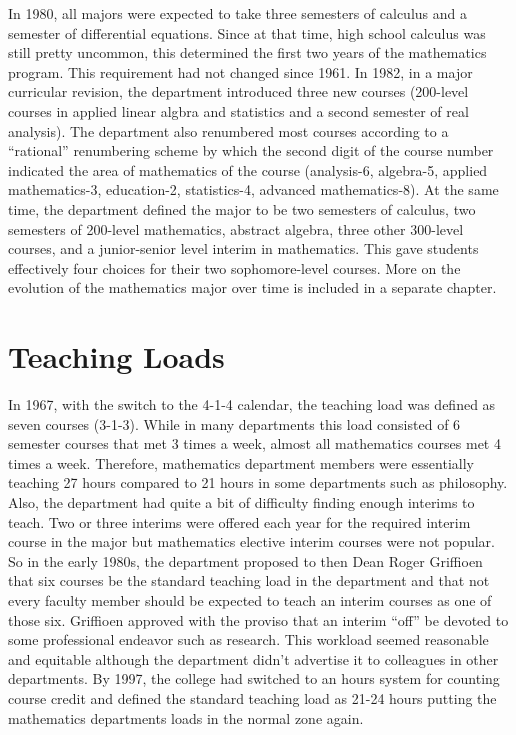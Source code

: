 \documentclass[
]{book}
\begin{document}
In 1980, all majors were expected to take three semesters of calculus and a semester of differential equations. Since at that time, high school calculus was still pretty uncommon, this determined the first two years of the mathematics program. This requirement had not changed since 1961. In 1982, in a major curricular revision, the department introduced three new courses (200-level courses in applied linear algbra and statistics and a second semester of real analysis). The department also renumbered most courses according to a ``rational'' renumbering scheme by which the second digit of the course number indicated the area of mathematics of the course (analysis-6, algebra-5, applied mathematics-3, education-2, statistics-4, advanced mathematics-8). At the same time, the department defined the major to be two semesters of calculus, two semesters of 200-level mathematics, abstract algebra, three other 300-level courses, and a junior-senior level interim in mathematics. This gave students effectively four choices for their two sophomore-level courses. More on the evolution of the mathematics major over time is included in a separate chapter.

\hypertarget{teaching-loads}{%
\section{Teaching Loads}\label{teaching-loads}}

In 1967, with the switch to the 4-1-4 calendar, the teaching load was defined as seven courses (3-1-3). While in many departments this load consisted of 6 semester courses that met 3 times a week, almost all mathematics courses met 4 times a week. Therefore, mathematics department members were essentially teaching 27 hours compared to 21 hours in some departments such as philosophy. Also, the department had quite a bit of difficulty finding enough interims to teach. Two or three interims were offered each year for the required interim course in the major but mathematics elective interim courses were not popular. So in the early 1980s, the department proposed to then Dean Roger Griffioen that six courses be the standard teaching load in the department and that not every faculty member should be expected to teach an interim courses as one of those six. Griffioen approved with the proviso that an interim ``off'' be devoted to some professional endeavor such as research. This workload seemed reasonable and equitable although the department didn't advertise it to colleagues in other departments. By 1997, the college had switched to an hours system for counting course credit and defined the standard teaching load as 21-24 hours putting the mathematics departments loads in the normal zone again.
\end{document}
